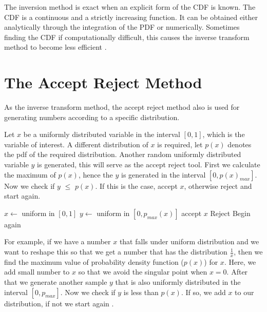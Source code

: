 The inversion method is exact when an explicit form of the CDF is known. The CDF is a continuous and a strictly increasing function. It can be obtained either analytically through the integration of the PDF or numerically. Sometimes finding the CDF if computationally difficult, this causes the inverse transform method to become less efficient \citep{Devroye:1986:SNR:318242.318443}.

\section{The Accept Reject Method}
As the inverse transform method, the accept reject method also is used for generating numbers according to a specific distribution.

Let $x$ be a uniformly distributed variable in the interval $[0,1]$, which is the variable of interest. A different distribution of $x$ is required, let $p(x)$ denotes the pdf of the required distribution. Another  random uniformly distributed variable $y$ is generated, this will serve as the accept reject tool. First we calculate the maximum of $p(x)$, hence the $y$ is generated in the interval $[0,p(x)_{max}]$. Now we check if $y$ $\leq$ $p(x)$. If this is the case, accept $x$, otherwise reject and start again. 
\begin{algorithmic} 
\State $x \gets$ uniform in $[0, 1]$
\State $y \gets$ uniform in $[0, p_{max}(x)]$
    \State accept $x$
\Else 
	\State Reject 
\EndIf
\State Begin again
\end{algorithmic}
% 

 
For example, if we have a number $x$ that falls under uniform distribution and we want to reshape this so that we get a number  that has the distribution $\frac{1}{x}$, then we find the maximum value of probability density function ($p(x)$) for $x$. Here, we add small number to $x$ so that we avoid the singular point when $x = 0$. After that we generate another sample $y$ that is also uniformly distributed in the interval $[0,p_{max}]$. 
Now we check if $y $ is less than $p(x)$. If so, we add $x$ to our distribution, if not we start again \citep{Weinzierl}. 

